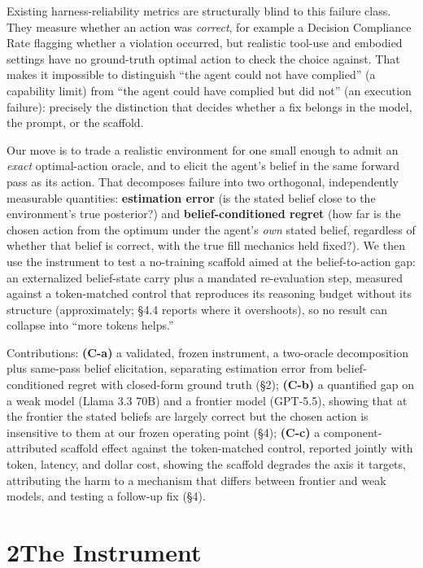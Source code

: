 \documentclass[
  10pt,
]{article}
\begin{document}
Existing harness-reliability metrics are structurally blind to this failure class. They measure whether an action was \emph{correct}, for example a Decision Compliance Rate flagging whether a violation occurred, but realistic tool-use and embodied settings have no ground-truth optimal action to check the choice against. That makes it impossible to distinguish ``the agent could not have complied'' (a capability limit) from ``the agent could have complied but did not'' (an execution failure): precisely the distinction that decides whether a fix belongs in the model, the prompt, or the scaffold.

Our move is to trade a realistic environment for one small enough to admit an \emph{exact} optimal-action oracle, and to elicit the agent's belief in the same forward pass as its action. That decomposes failure into two orthogonal, independently measurable quantities: \textbf{estimation error} (is the stated belief close to the environment's true posterior?) and \textbf{belief-conditioned regret} (how far is the chosen action from the optimum under the agent's \emph{own} stated belief, regardless of whether that belief is correct, with the true fill mechanics held fixed?). We then use the instrument to test a no-training scaffold aimed at the belief-to-action gap: an externalized belief-state carry plus a mandated re-evaluation step, measured against a token-matched control that reproduces its reasoning budget without its structure (approximately; §4.4 reports where it overshoots), so no result can collapse into ``more tokens helps.''

Contributions: \textbf{(C-a)} a validated, frozen instrument, a two-oracle decomposition plus same-pass belief elicitation, separating estimation error from belief-conditioned regret with closed-form ground truth (§2); \textbf{(C-b)} a quantified gap on a weak model (Llama 3.3 70B) and a frontier model (GPT-5.5), showing that at the frontier the stated beliefs are largely correct but the chosen action is insensitive to them at our frozen operating point (§4); \textbf{(C-c)} a component-attributed scaffold effect against the token-matched control, reported jointly with token, latency, and dollar cost, showing the scaffold degrades the axis it targets, attributing the harm to a mechanism that differs between frontier and weak models, and testing a follow-up fix (§4).

\section{2\quad The Instrument}\label{the-instrument}
\end{document}
